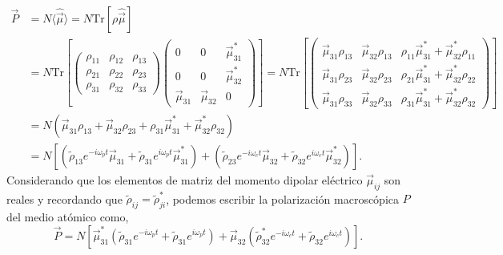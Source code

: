 \begin{equation}
    \begin{split}
        \vec{P} &= N \langle \hat{\vec{\mu}} \rangle = N \text{Tr}[\rho \hat{\vec{\mu}}]\\
        &= N \text{Tr} \left[ \begin{pmatrix}
        \rho_{11} & \rho_{12} & \rho_{13}\\
        \rho_{21} & \rho_{22} & \rho_{23}\\
        \rho_{31} & \rho_{32} & \rho_{33}
        \end{pmatrix} \begin{pmatrix}
        0 & 0 & \vec{\mu}_{31}^* \\
        0 & 0 & \vec{\mu}_{32}^* \\
        \vec{\mu}_{31} & \vec{\mu}_{32} & 0
        \end{pmatrix} \right]
        =  N \text{Tr} \left[ \begin{pmatrix}
        \vec{\mu}_{31} \rho_{13} & \vec{\mu}_{32} \rho_{13} & \rho_{11}\vec{\mu}_{31}^* + \vec{\mu}_{32}^* \rho_{11} \\
        \vec{\mu}_{31} \rho_{23} & \vec{\mu}_{32} \rho_{23} & \rho_{21}\vec{\mu}_{31}^* + \vec{\mu}_{32}^* \rho_{22}\\
        \vec{\mu}_{31} \rho_{33} & \vec{\mu}_{32} \rho_{33} & \rho_{31}\vec{\mu}_{31}^* + \vec{\mu}_{32}^* \rho_{32}
        \end{pmatrix} \right] \\
        &=  N (\vec{\mu}_{31} \rho_{13} + \vec{\mu}_{32} \rho_{23} + \rho_{31}\vec{\mu}_{31}^* + \vec{\mu}_{32}^* \rho_{32})\\
        &= N \left[(\tilde{\rho}_{13}e^{-i \omega_p t} \vec{\mu}_{31} + \tilde{\rho}_{31}e^{i \omega_p t} \vec{\mu}_{31}^*) + (\tilde{\rho}_{23}e^{-i \omega_c t} \vec{\mu}_{32} + \tilde{\rho}_{32}e^{i \omega_c t} \vec{\mu}_{32}^*)\right].
    \end{split}
\end{equation}
Considerando que los elementos de matriz del momento dipolar eléctrico $\vec{\mu}_{ij}$ son reales y recordando que $\tilde{\rho}_{ij} = \tilde{\rho}_{ji}^*$, podemos escribir la polarización macroscópica $P$ del medio atómico como,
\begin{equation}
    \vec{P} = N \left[\vec{\mu}_{31}^* (\tilde{\rho}_{31}e^{-i \omega_p t} + \tilde{\rho}_{31} e^{i \omega_p t}) + \vec{\mu}_{32} (\tilde{\rho}_{32}^* e^{-i \omega_c t} + \tilde{\rho}_{32} e^{i \omega_c t})\right].
\end{equation}
